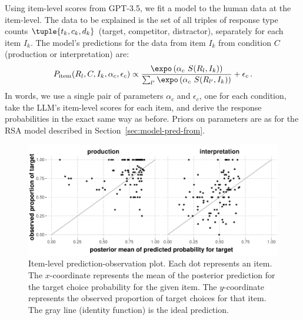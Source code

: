 \documentclass[fleqn]{article}
\begin{document}
Using item-level scores from GPT-3.5, we fit a model to the human data at the item-level.
The data to be explained is the set of all triples of response type counts $\tuple{t_{k}, c_{k}, d_{k}}$ (target, competitor, distractor), separately for each item $I_{k}$.
The model's predictions for the data from item $I_{k}$ from condition $C$ (production or interpretation) are:
%
\begin{align*}
  P_{\text{item}}(R_{l}, C, I_{k}, \alpha_{c}, \epsilon_{c}) \propto \frac{\expo \left( \alpha_{c} \ S(R_{l}, I_{k}) \right )}{ \sum_{l'} \expo \left( \alpha_{c} \ S(R_{l'}, I_{k}) \right )} + \epsilon_{c}\,.
\end{align*}
%
In words, we use a single pair of parameters $\alpha_{c}$ and $\epsilon_{c}$, one for each condition, take the LLM's item-level scores for each item, and derive the response probabilities in the exact same way as before.
Priors on parameters are as for the RSA model described in Section~\ref{sec:model-pred-from}.

\begin{figure}[t]
  \centering

  \includegraphics[width = 0.9\linewidth]{00-pics/item-combined-obs-pred.pdf}

  \caption{
    Item-level prediction-observation plot.
    Each dot represents an item.
    The $x$-coordinate represents the mean of the posterior prediction for the target choice probability for the given item.
    The $y$-coordinate represents the observed proportion of target choices for that item.
    The gray line (identity function) is the ideal prediction.
  }
  \label{fig:item-level-obs-pred}
\end{figure}
\end{document}
